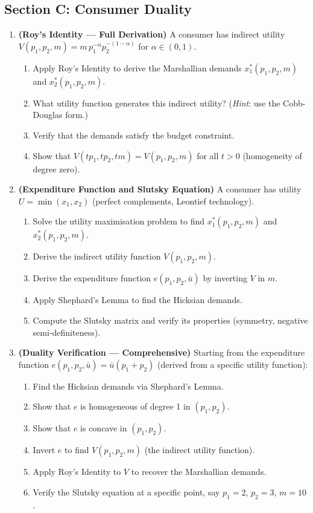 \documentclass[12pt, a4paper]{article}
\theoremstyle{definition}
\begin{document}
\subsection{Section C: Consumer Duality}

\begin{enumerate}[label=\textbf{C\arabic*.}, leftmargin=2.5em]

\item \textbf{(Roy's Identity --- Full Derivation)}
A consumer has indirect utility $V(p_1,p_2,m) = m\,p_1^{-\alpha}p_2^{-(1-\alpha)}$
for $\alpha\in(0,1)$.
\begin{enumerate}[label=(\alph*)]
  \item Apply Roy's Identity to derive the Marshallian demands
        $x_1^*(p_1,p_2,m)$ and $x_2^*(p_1,p_2,m)$.
  \item What utility function generates this indirect utility?
        (\textit{Hint}: use the Cobb-Douglas form.)
  \item Verify that the demands satisfy the budget constraint.
  \item Show that $V(tp_1,tp_2,tm) = V(p_1,p_2,m)$ for all $t>0$
        (homogeneity of degree zero).
\end{enumerate}

\item \textbf{(Expenditure Function and Slutsky Equation)}
A consumer has utility $U = \min(x_1, x_2)$ (perfect complements,
Leontief technology).
\begin{enumerate}[label=(\alph*)]
  \item Solve the utility maximisation problem to find
        $x_1^*(p_1,p_2,m)$ and $x_2^*(p_1,p_2,m)$.
  \item Derive the indirect utility function $V(p_1,p_2,m)$.
  \item Derive the expenditure function $e(p_1,p_2,\bar u)$ by inverting
        $V$ in $m$.
  \item Apply Shephard's Lemma to find the Hicksian demands.
  \item Compute the Slutsky matrix and verify its properties
        (symmetry, negative semi-definiteness).
\end{enumerate}

\item \textbf{(Duality Verification --- Comprehensive)}
Starting from the expenditure function
$e(p_1,p_2,\bar u) = \bar u(p_1 + p_2)$ (derived from a specific utility
function):
\begin{enumerate}[label=(\alph*)]
  \item Find the Hicksian demands via Shephard's Lemma.
  \item Show that $e$ is homogeneous of degree 1 in $(p_1,p_2)$.
  \item Show that $e$ is concave in $(p_1,p_2)$.
  \item Invert $e$ to find $V(p_1,p_2,m)$ (the indirect utility function).
  \item Apply Roy's Identity to $V$ to recover the Marshallian demands.
  \item Verify the Slutsky equation at a specific point, say
        $p_1=2$, $p_2=3$, $m=10$.
\end{enumerate}


\end{enumerate}
\end{document}
